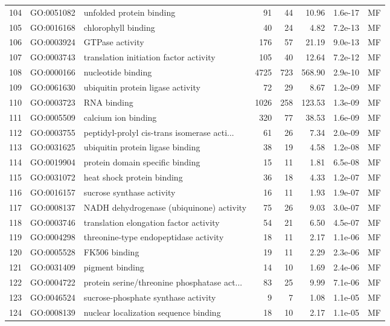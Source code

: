 \documentclass[12pt,oneside,a4paper]{article}
\begin{document}
\begin{longtable}{rllrrrll}
  104 & GO:0051082 & unfolded protein binding &  91 &  44 & 10.96 & 1.6e-17 & MF \\ 
  105 & GO:0016168 & chlorophyll binding &  40 &  24 & 4.82 & 7.2e-13 & MF \\ 
  106 & GO:0003924 & GTPase activity & 176 &  57 & 21.19 & 9.0e-13 & MF \\ 
  107 & GO:0003743 & translation initiation factor activity & 105 &  40 & 12.64 & 7.2e-12 & MF \\ 
  108 & GO:0000166 & nucleotide binding & 4725 & 723 & 568.90 & 2.9e-10 & MF \\ 
  109 & GO:0061630 & ubiquitin protein ligase activity &  72 &  29 & 8.67 & 1.2e-09 & MF \\ 
  110 & GO:0003723 & RNA binding & 1026 & 258 & 123.53 & 1.3e-09 & MF \\ 
  111 & GO:0005509 & calcium ion binding & 320 &  77 & 38.53 & 1.6e-09 & MF \\ 
  112 & GO:0003755 & peptidyl-prolyl cis-trans isomerase acti... &  61 &  26 & 7.34 & 2.0e-09 & MF \\ 
  113 & GO:0031625 & ubiquitin protein ligase binding &  38 &  19 & 4.58 & 1.2e-08 & MF \\ 
  114 & GO:0019904 & protein domain specific binding &  15 &  11 & 1.81 & 6.5e-08 & MF \\ 
  115 & GO:0031072 & heat shock protein binding &  36 &  18 & 4.33 & 1.2e-07 & MF \\ 
  116 & GO:0016157 & sucrose synthase activity &  16 &  11 & 1.93 & 1.9e-07 & MF \\ 
  117 & GO:0008137 & NADH dehydrogenase (ubiquinone) activity &  75 &  26 & 9.03 & 3.0e-07 & MF \\ 
  118 & GO:0003746 & translation elongation factor activity &  54 &  21 & 6.50 & 4.5e-07 & MF \\ 
  119 & GO:0004298 & threonine-type endopeptidase activity &  18 &  11 & 2.17 & 1.1e-06 & MF \\ 
  120 & GO:0005528 & FK506 binding &  19 &  11 & 2.29 & 2.3e-06 & MF \\ 
  121 & GO:0031409 & pigment binding &  14 &  10 & 1.69 & 2.4e-06 & MF \\ 
  122 & GO:0004722 & protein serine/threonine phosphatase act... &  83 &  25 & 9.99 & 7.1e-06 & MF \\ 
  123 & GO:0046524 & sucrose-phosphate synthase activity &   9 &   7 & 1.08 & 1.1e-05 & MF \\ 
  124 & GO:0008139 & nuclear localization sequence binding &  18 &  10 & 2.17 & 1.1e-05 & MF \\ 

\end{longtable}
\end{document}
